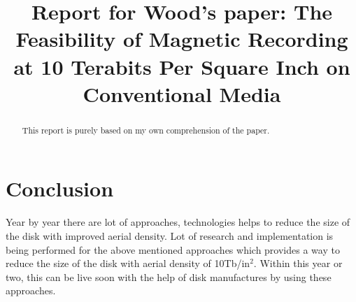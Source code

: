 \documentclass[conference]{IEEEtran}
\begin{document}
\title{Report for Wood's paper: 
The Feasibility of Magnetic Recording at 10 Terabits Per Square Inch on Conventional Media}

\author{
}

\maketitle

\begin{abstract}
This report is purely based on my own comprehension of the paper.
\end{abstract}

\IEEEpeerreviewmaketitle








\section{Conclusion}
Year by year there are lot of approaches, technologies helps to reduce the size of the disk with improved aerial density. Lot of research and implementation is being performed for the above mentioned approaches which provides a way to reduce the size of the disk with aerial density of 10Tb/in$^2$. Within this year or two, this can be live soon with the help of disk manufactures by using these approaches.






\end{document}
